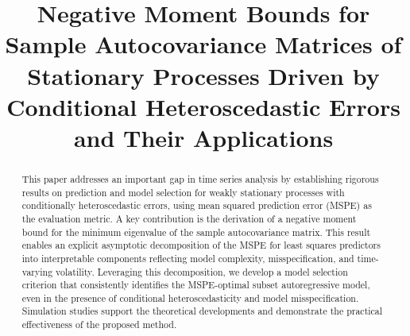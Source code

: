 \documentclass[ejsv2]{imsart}
\theoremstyle{plain}
\theoremstyle{definition}
\theoremstyle{remark}
\begin{document}
\begin{frontmatter}
\title{Negative Moment Bounds for Sample Autocovariance Matrices of Stationary Processes Driven by Conditional Heteroscedastic Errors and Their Applications}


\begin{abstract}
This paper addresses an important gap in time series analysis by establishing rigorous results on prediction and model selection for weakly stationary processes with conditionally heteroscedastic errors, using mean squared prediction error (MSPE) as the evaluation metric. A key contribution is the derivation of a negative moment bound for the minimum eigenvalue of the sample autocovariance matrix. This result enables an explicit asymptotic decomposition of the MSPE for least squares predictors into interpretable components reflecting model complexity, misspecification, and time-varying volatility. Leveraging this decomposition, we develop a model selection criterion that consistently identifies the MSPE-optimal subset autoregressive model, even in the presence of conditional heteroscedasticity and model misspecification. Simulation studies support the theoretical developments and demonstrate the practical effectiveness of the proposed method.
\end{abstract}


\end{frontmatter}
\end{document}
